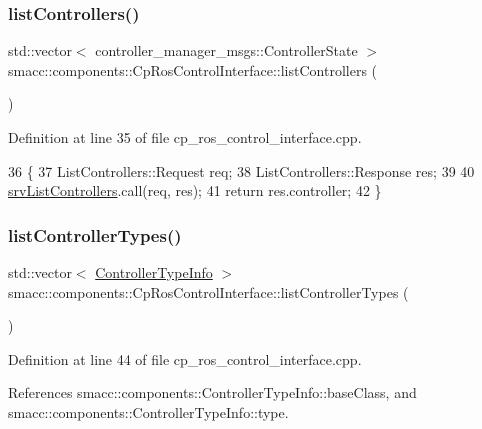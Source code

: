 \subsubsection{\texorpdfstring{list\+Controllers()}{listControllers()}}
{\footnotesize\ttfamily std\+::vector$<$ controller\+\_\+manager\+\_\+msgs\+::\+Controller\+State $>$ smacc\+::components\+::\+Cp\+Ros\+Control\+Interface\+::list\+Controllers (\begin{DoxyParamCaption}{ }\end{DoxyParamCaption})}



Definition at line 35 of file cp\+\_\+ros\+\_\+control\+\_\+interface.\+cpp.


\begin{DoxyCode}
36 \{
37     ListControllers::Request req;
38     ListControllers::Response res;
39 
40     \hyperlink{classsmacc_1_1components_1_1CpRosControlInterface_aec2d2eb63ad4f04741493329e6c33696}{srvListControllers}.call(req, res);
41     \textcolor{keywordflow}{return} res.controller;
42 \}
\end{DoxyCode}
\mbox{\label{classsmacc_1_1components_1_1CpRosControlInterface_ae900aa88dff13169cdb22c68a7e5d539}} 
\subsubsection{\texorpdfstring{list\+Controller\+Types()}{listControllerTypes()}}
{\footnotesize\ttfamily std\+::vector$<$ \hyperlink{structsmacc_1_1components_1_1ControllerTypeInfo}{Controller\+Type\+Info} $>$ smacc\+::components\+::\+Cp\+Ros\+Control\+Interface\+::list\+Controller\+Types (\begin{DoxyParamCaption}{ }\end{DoxyParamCaption})}



Definition at line 44 of file cp\+\_\+ros\+\_\+control\+\_\+interface.\+cpp.



References smacc\+::components\+::\+Controller\+Type\+Info\+::base\+Class, and smacc\+::components\+::\+Controller\+Type\+Info\+::type.


